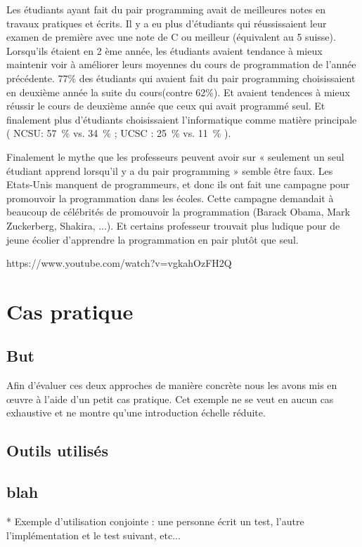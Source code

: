 \documentclass[journal, a4paper, frenchb]{IEEEtran}
\begin{document}
Les étudiants ayant fait du pair programming avait de meilleures notes en travaux pratiques et écrits. Il y a eu plus d’étudiants qui réussissaient leur examen de première avec une note de C ou meilleur (équivalent au 5 suisse). Lorsqu’ils étaient en 2 ème année, les étudiants avaient tendance à mieux maintenir voir à améliorer leurs moyennes du cours de programmation de l’année précédente. 77\% des étudiants qui avaient fait du pair programming choisissaient en deuxième année la suite du cours(contre 62\%). Et avaient tendences à mieux réussir le cours de deuxième année que ceux qui avait programmé seul. Et finalement plus d’étudiants choisissaient l’informatique comme matière principale ( NCSU: 57~\% vs. 34~\% ; UCSC : 25~\% vs. 11~\% ).

Finalement le mythe que les professeurs peuvent avoir sur « seulement un seul étudiant apprend lorsqu’il y a du pair programming » semble être faux. Les Etats-Unis manquent de programmeurs, et donc ils ont fait une campagne pour promouvoir la programmation dans les écoles. Cette campagne demandait à beaucoup de célébrités de promouvoir la programmation (Barack Obama, Mark Zuckerberg, Shakira, ...). Et certains professeur trouvait plus ludique pour de jeune écolier d’apprendre la programmation en pair plutôt que seul.

https://www.youtube.com/watch?v=vgkahOzFH2Q

\section{Cas pratique}

\subsection{But}

Afin d'évaluer ces deux approches de manière concrète nous les avons mis en œuvre à l'aide d'un petit cas pratique. Cet exemple ne se veut en aucun cas exhaustive et ne montre qu'une introduction échelle réduite.


\subsection{Outils utilisés}

\subsection{blah}

* Exemple d'utilisation conjointe : une personne écrit un test, l'autre l'implémentation et le test suivant, etc...
\end{document}
